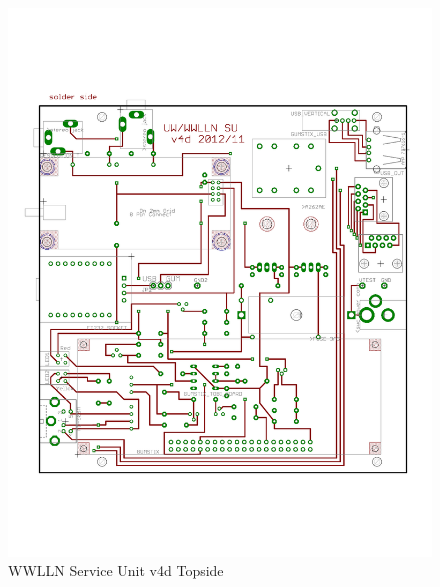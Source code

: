 \begin{figure}[ht!]
   \centering
   \includegraphics[scale=.75]{Appendix/Figures/wwlln_SU_v4_top.pdf} 
   \caption{WWLLN Service Unit v4d Topside}
   \label{app:suTop}
\end{figure}

